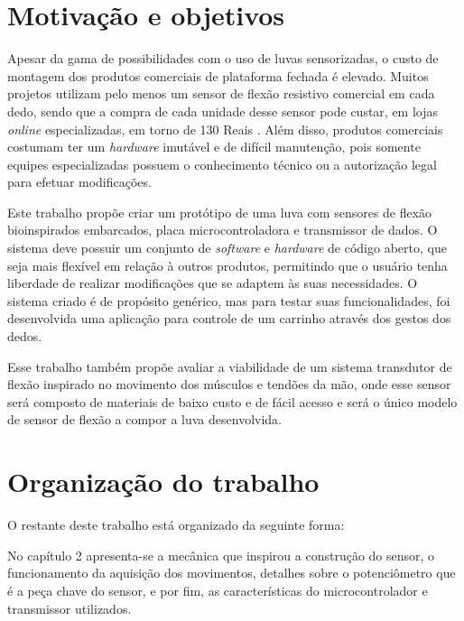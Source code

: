 \documentclass[
	12pt,				%
	openright,			%
	oneside,			%
	a4paper,			%
	english,			%
	brazil				%
	]{abntex2}
\begin{document}

		
		
		
		\section{Motivação e objetivos}

		Apesar da gama de possibilidades com o uso de luvas sensorizadas, o custo de montagem dos produtos comerciais de plataforma fechada é elevado. Muitos projetos utilizam pelo menos um sensor de flexão resistivo comercial em cada dedo, sendo que a compra de cada unidade desse sensor pode custar, em lojas \textit{online} especializadas, em torno de 130 Reais \cite{multilogicaflexsensor}. Além disso, produtos comerciais costumam ter um \textit{hardware} imutável e de difícil manutenção, pois somente equipes especializadas possuem o conhecimento técnico ou a autorização legal para efetuar modificações.

		Este trabalho propõe criar um protótipo de uma luva com sensores de flexão bioinspirados embarcados, placa microcontroladora e transmissor de dados. O sistema deve possuir um conjunto de \textit{software} e \textit{hardware} de código aberto, que seja mais flexível em relação à outros produtos, permitindo que o usuário tenha liberdade de realizar modificações que se adaptem às suas necessidades. O sistema criado é de propósito genérico, mas para testar suas funcionalidades, foi desenvolvida uma aplicação para controle de um carrinho através dos gestos dos dedos.

		Esse trabalho também propõe avaliar a viabilidade de um sistema transdutor de flexão inspirado no movimento dos músculos e tendões da mão, onde esse sensor será composto de materiais de baixo custo e de fácil acesso e será o único modelo de sensor de flexão a compor a luva desenvolvida.	
	
		\section{Organização do trabalho}

		O restante deste trabalho está organizado da seguinte forma:

		No capítulo 2 apresenta-se a mecânica que inspirou a construção do sensor, o funcionamento da aquisição dos movimentos, detalhes sobre o potenciômetro que é a peça chave do sensor, e por fim, as características do microcontrolador e transmissor utilizados.
		
\end{document}
